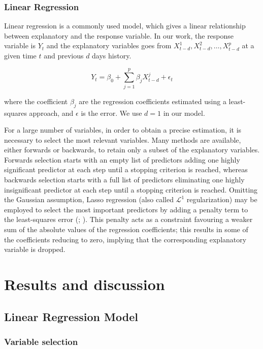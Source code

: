\documentclass[12pt]{article}
\begin{document}
\subsubsection{Linear Regression}

Linear regression is a commonly used model, which gives a linear relationship between explanatory and the response variable. In our work, the response variable is $Y_t$ and the explanatory variables goes from $X_{t-d}^1, X_{t-d}^2,\ldots,X_{t-d}^p$ at a given time $t$ and previous $d$ days history.

\begin{equation}
	Y_{t} = \beta_0+\sum_{j=1}^p \beta_j X_{t-d}^j + \epsilon_t
\end{equation}

where the coefficient $\beta_j$ are the regression coefficients estimated using a least-squares approach, and $\epsilon$ is the error. We use $d=1$ in our model.

For a large number of variables, in order to obtain a precise estimation, it is necessary to select the most relevant variables. Many methods are available, either forwards or backwards, to retain only a subset of the explanatory variables. Forwards selection starts with an empty list of predictors adding one highly significant predictor at each step until a stopping criterion is reached, whereas backwards selection starts with a full list of predictors eliminating one highly insignificant predictor at each step until a stopping criterion is reached. Omitting the Gaussian assumption, Lasso regression (also called $\mathcal{L}^1$ regularization) may be employed to select the most important predictors by adding a penalty term to the least-squares error (\cite{ISL2}; \cite{Tibshirani1996}). This penalty acts as a constraint favouring a weaker sum of the absolute values of the regression coefficients; this results in some of the coefficients reducing to zero, implying that the corresponding explanatory variable is dropped.


\section{Results and discussion}

\subsection{Linear Regression Model}
\subsubsection{Variable selection}
\end{document}
